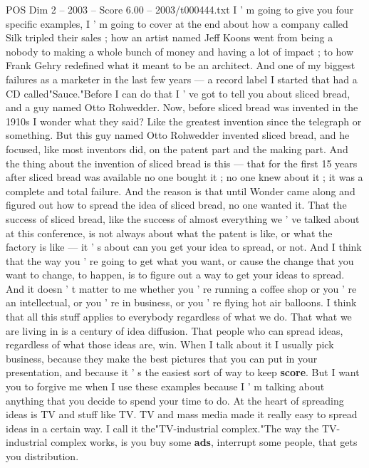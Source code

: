 \begin{textsample}{POS Dim 2 – 2003 – Score 6.00 – 2003/t000444.txt}  \label{ex:f2_pos_081}
I ' m going to give you four specific examples, I ' m going to cover at the end about how a company called Silk tripled their sales ; how an artist named Jeff Koons went from being a nobody to making a whole bunch of money and having a lot of impact ; to how Frank Gehry redefined what it meant to be an architect.
And one of my biggest failures as a marketer in the last few years — a record label I started that had a CD called"Sauce."Before I can do that I ' ve got to tell you about sliced bread, and a guy named Otto Rohwedder.
Now, before sliced bread was invented in the 1910s I wonder what they said?
Like the greatest invention since the telegraph or something.
But this guy named Otto Rohwedder invented sliced bread, and he focused, like most inventors did, on the patent part and the making part.
And the thing about the invention of sliced bread is this — that for the first 15 years after sliced bread was available no one bought it ; no one knew about it ; it was a complete and total failure.
And the reason is that until Wonder came along and figured out how to spread the idea of sliced bread, no one wanted it.
That the success of sliced bread, like the success of almost everything we ' ve talked about at this conference, is not always about what the patent is like, or what the factory is like — it ' s about can you get your idea to spread, or not.
And I think that the way you ' re going to get what you want, or cause the change that you want to change, to happen, is to figure out a way to get your ideas to spread.
And it doesn ' t matter to me whether you ' re running a coffee shop or you ' re an intellectual, or you ' re in business, or you ' re flying hot air balloons.
I think that all this stuff applies to everybody regardless of what we do.
That what we are living in is a century of idea diffusion.
That people who can spread ideas, regardless of what those ideas are, win.
When I talk about it I usually pick business, because they make the best pictures that you can put in your presentation, and because it ' s the easiest sort of way to keep \textbf{score}.
But I want you to forgive me when I use these examples because I ' m talking about anything that you decide to spend your time to do.
At the heart of spreading ideas is TV and stuff like TV.
TV and mass media made it really easy to spread ideas in a certain way.
I call it the"TV-industrial complex."The way the TV-industrial complex works, is you buy some \textbf{ads}, interrupt some people, that gets you distribution.

\end{textsample}

